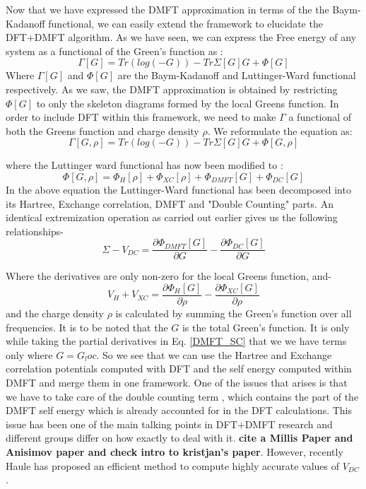 \documentclass[12pt,letter]{article}
\begin{document}
Now that we have expressed the DMFT approximation in terms of the the Baym-Kadanoff functional, we can easily extend the framework to elucidate the DFT+DMFT algorithm. As we have seen, we can express the Free energy of any system as a functional of the Green's function as :
\begin{equation}
\Gamma[G]= Tr(log(-G)) -Tr \Sigma[G]G +\Phi[G]
\end{equation}
Where $\Gamma[G]$ and $\Phi[G]$ are the Baym-Kadanoff and Luttinger-Ward functional respectively. As we saw, the DMFT approximation is obtained by restricting $\Phi[G]$ to only the skeleton diagrams formed by the local Greens function. In order to include DFT within this framework, we need to make $\Gamma$ a functional of both the Greens function and charge density $\rho$. We reformulate the equation as:
\begin{equation}
 \Gamma[G,\rho]= Tr(log(-G)) -Tr \Sigma[G]G +\Phi[G,\rho]
\end{equation}  
 
 where the Luttinger ward functional has now been modified to :
 \begin{equation}
 \Phi[G,\rho]=\Phi_{H}[\rho]+\Phi_{XC}[\rho]+\Phi_{DMFT}[G]+\Phi_{DC}[G]
 \end{equation}
 In the above equation the Luttinger-Ward functional has been decomposed into its Hartree, Exchange correlation, DMFT and "Double Counting" parts.  An identical extremization operation as carried out earlier gives us the following relationships-
\begin{equation}\label{DMFT_SC}
 \Sigma-V_{DC}=  \dfrac{\partial \Phi_{DMFT}[G]}{\partial G}- \dfrac{\partial \Phi_{DC}[G]}{\partial G}
 \end{equation} 
 
 Where the derivatives are only non-zero for the local Greens function, and-
 \begin{equation}
V_H+V_{XC}=\dfrac{\partial \Phi_{H}[G]}{\partial \rho}- \dfrac{\partial \Phi_{XC}[G]}{\partial \rho}
 \end{equation}
 and the charge density $\rho$ is calculated by summing the Green's function over all frequencies. It is to be noted that the $G$ is the total Green's function. It is only while taking the partial derivatives in Eq. \ref{DMFT_SC} that we we have terms only where $G=G_loc$. So we see that we can use the Hartree and Exchange correlation potentials computed with DFT and the self energy computed within DMFT and merge them in one framework. One of the issues that arises is that we have to take care of the double counting term , which contains the part of the DMFT self energy which is already accounted for in the DFT calculations. This issue has been one of the main talking points in DFT+DMFT research and different groups differ on how exactly to deal with it. \textbf{cite a Millis Paper and Anisimov paper and check intro to kristjan's paper}. However, recently Haule has proposed an efficient method to compute highly accurate values of $V_{DC} $.
 
\end{document}
